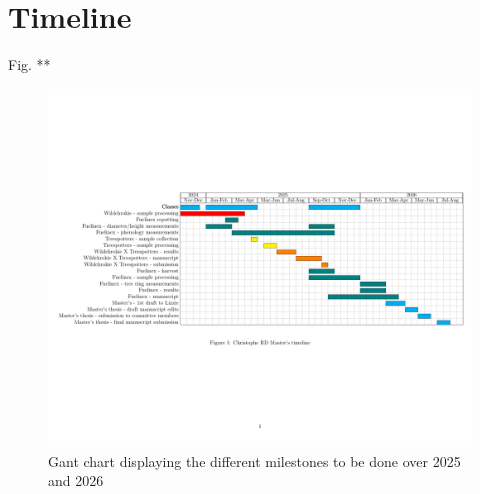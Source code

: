 \documentclass{article}
\begin{document}
\section{Timeline} 
Fig. **
\begin{figure}[h]
\includegraphics[width=1.1\textwidth]{ganttChart.pdf}
\caption{Gant chart displaying the different milestones to be done over 2025 and 2026}
\label{fig:sample}
\end{figure}



\end{document}
